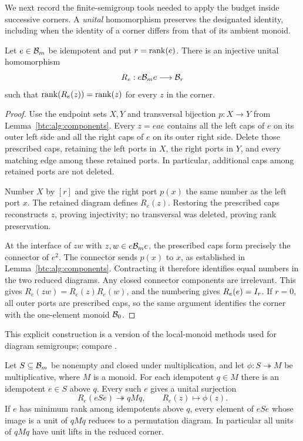 We next record the finite-semigroup tools needed to apply the budget
inside successive corners. A \emph{unital} homomorphism preserves
the designated identity, including when the identity of a corner
differs from that of its ambient monoid.

\begin{lemma}\label{btc:alg:corner}
Let $e\in\mathcal{B}_{m}$ be idempotent and put $r=\operatorname{rank}(e)$. There is an
injective unital homomorphism
\[
 R_e:e\mathcal{B}_{m}e\longrightarrow\mathcal{B}_{r}
\]
such that $\operatorname{rank}(R_e(z))=\operatorname{rank}(z)$ for every $z$ in the corner.
\end{lemma}

\begin{proof}
Use the endpoint sets $X,Y$ and transversal bijection $p:X\to Y$
from Lemma~\ref{btc:alg:components}. Every $z=eae$ contains all the
left caps of $e$ on its outer left side and all the right caps of
$e$ on its outer right side. Delete those prescribed caps, retaining
the left ports in $X$, the right ports in $Y$, and every matching
edge among these retained ports. In particular, additional caps
among retained ports are not deleted.

Number $X$ by $[r]$ and give the right port $p(x)$ the same number
as the left port $x$. The retained diagram defines $R_e(z)$.
Restoring the prescribed caps reconstructs $z$, proving injectivity;
no transversal was deleted, proving rank preservation.

At the interface of $zw$ with $z,w\in e\mathcal{B}_{m}e$, the prescribed
caps form precisely the connector of $e^2$. The connector sends
$p(x)$ to $x$, as established in Lemma~\ref{btc:alg:components}.
Contracting it therefore identifies equal numbers in the two reduced
diagrams. Any closed connector components are irrelevant. This gives
$R_e(zw)=R_e(z)R_e(w)$, and the numbering gives $R_e(e)=I_r$.
If $r=0$, all outer ports are prescribed caps, so the same argument
identifies the corner with the one-element monoid $\mathcal{B}_{0}$.
\end{proof}

This explicit construction is a version of the local-monoid methods
used for diagram semigroups; compare
\cite{Auinger2012,Pin1997,OpenAILiveness2026}.

\begin{lemma}\label{btc:alg:unit-lifts}
Let $S\subseteq\mathcal{B}_{m}$ be nonempty and closed under multiplication,
and let $\phi:S\twoheadrightarrow M$ be multiplicative, where $M$
is a monoid. For each idempotent $q\in M$ there is an idempotent
$e\in S$ above $q$. Every such $e$ gives a unital surjection
\begin{equation}\label{btc:alg:induced-corner-map}
 R_e(eSe)\twoheadrightarrow qMq,\qquad R_e(z)\longmapsto\phi(z).
\end{equation}
If $e$ has minimum rank among idempotents above $q$, every element
of $eSe$ whose image is a unit of $qMq$ reduces to a permutation
diagram. In particular all units of $qMq$ have unit lifts in the
reduced corner.
\end{lemma}

